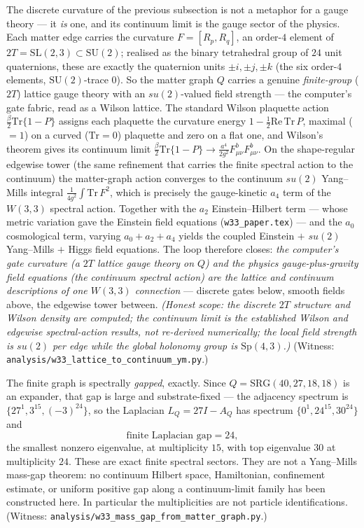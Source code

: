 \documentclass[11pt]{article}
\begin{document}
The discrete curvature of the previous subsection is not a metaphor for a gauge
theory --- it \emph{is} one, and its continuum limit is the gauge sector of the
physics. Each matter edge carries the curvature $F=[R_p,R_q]$, an order-$4$
element of $2T=\mathrm{SL}(2,3)\subset\mathrm{SU}(2)$; realised as the binary
tetrahedral group of $24$ unit quaternions, these are exactly the quaternion
units $\pm i,\pm j,\pm k$ (the six order-$4$ elements, $\mathrm{SU}(2)$-trace
$0$). So the matter graph $Q$ carries a genuine \emph{finite-group}
($2T$) lattice gauge theory with an $su(2)$-valued field strength --- the
computer's gate fabric, read as a Wilson lattice. The standard Wilson plaquette
action $\tfrac\beta2\mathrm{Tr}\{1-P\}$ assigns each plaquette the curvature
energy $1-\tfrac12\mathrm{Re}\,\mathrm{Tr}\,P$, maximal ($=1$) on a curved
($\mathrm{Tr}=0$) plaquette and zero on a flat one, and Wilson's theorem gives
its continuum limit $\tfrac\beta2\mathrm{Tr}\{1-P\}\to\tfrac{a^4}{2g^2}F^b_{\mu\nu}F^b_{\mu\nu}$.
On the shape-regular edgewise tower (the same refinement that carries the finite
spectral action to the continuum) the matter-graph action converges to the
continuum $su(2)$ Yang--Mills integral $\tfrac1{4g^2}\!\int\!\mathrm{Tr}\,F^2$,
which is precisely the gauge-kinetic $a_4$ term of the $W(3,3)$ spectral action.
Together with the $a_2$ Einstein--Hilbert term --- whose metric variation gave
the Einstein field equations (\texttt{w33\_paper.tex}) --- and the $a_0$
cosmological term, varying $a_0+a_2+a_4$ yields the coupled Einstein $+$ $su(2)$
Yang--Mills $+$ Higgs field equations. The loop therefore closes: \emph{the
computer's gate curvature (a $2T$ lattice gauge theory on $Q$) and the physics
gauge-plus-gravity field equations (the continuum spectral action) are the
lattice and continuum descriptions of one $W(3,3)$ connection} --- discrete gates
below, smooth fields above, the edgewise tower between. \emph{(Honest scope: the
discrete $2T$ structure and Wilson density are computed; the continuum limit is
the established Wilson and edgewise spectral-action results, not re-derived
numerically; the local field strength is $su(2)$ per edge while the global
holonomy group is $\mathrm{Sp}(4,3)$.)} (Witness:
\texttt{analysis/w33\_lattice\_to\_continuum\_ym.py}.)

The finite graph is spectrally \emph{gapped}, exactly. Since
$Q=\mathrm{SRG}(40,27,18,18)$
is an expander, that gap is large and substrate-fixed --- the adjacency spectrum
is $\{27^1,3^{15},(-3)^{24}\}$, so the Laplacian $L_Q=27I-A_Q$ has spectrum
$\{0^1,24^{15},30^{24}\}$ and
\[
  \text{finite Laplacian gap}=24,
\]
the smallest nonzero eigenvalue, at multiplicity $15$, with top eigenvalue
$30$ at multiplicity $24$.  These are exact finite spectral sectors.
They are not a Yang--Mills mass-gap theorem: no continuum Hilbert space,
Hamiltonian, confinement estimate, or uniform positive gap along a
continuum-limit family has been constructed here.  In particular the
multiplicities are not particle identifications. (Witness:
\texttt{analysis/w33\_mass\_gap\_from\_matter\_graph.py}.)
\end{document}
